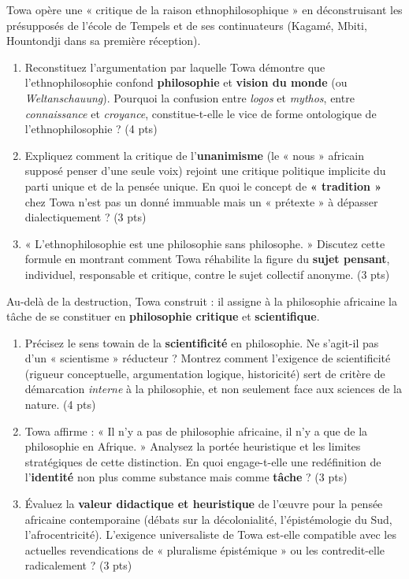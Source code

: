 \documentclass[11pt]{article}
\begin{document}
\begin{exercice}
Towa opère une « critique de la raison ethnophilosophique » en déconstruisant les présupposés de l'école de Tempels et de ses continuateurs (Kagamé, Mbiti, Hountondji dans sa première réception).
\begin{enumerate}
    \item Reconstituez l'argumentation par laquelle Towa démontre que l'ethnophilosophie confond \textbf{philosophie} et \textbf{vision du monde} (ou \textit{Weltanschauung}). Pourquoi la confusion entre \textit{logos} et \textit{mythos}, entre \textit{connaissance} et \textit{croyance}, constitue-t-elle le vice de forme ontologique de l'ethnophilosophie ? (4 pts)
    \item Expliquez comment la critique de l'\textbf{unanimisme} (le « nous » africain supposé penser d'une seule voix) rejoint une critique politique implicite du parti unique et de la pensée unique. En quoi le concept de \textbf{« tradition »} chez Towa n'est pas un donné immuable mais un « prétexte » à dépasser dialectiquement ? (3 pts)
    \item « L'ethnophilosophie est une philosophie sans philosophe. » Discutez cette formule en montrant comment Towa réhabilite la figure du \textbf{sujet pensant}, individuel, responsable et critique, contre le sujet collectif anonyme. (3 pts)
\end{enumerate}
\end{exercice}

\begin{exercice}
Au-delà de la destruction, Towa construit : il assigne à la philosophie africaine la tâche de se constituer en \textbf{philosophie critique} et \textbf{scientifique}.
\begin{enumerate}
    \item Précisez le sens towain de la \textbf{scientificité} en philosophie. Ne s'agit-il pas d'un « scientisme » réducteur ? Montrez comment l'exigence de scientificité (rigueur conceptuelle, argumentation logique, historicité) sert de critère de démarcation \textit{interne} à la philosophie, et non seulement face aux sciences de la nature. (4 pts)
    \item Towa affirme : « Il n'y a pas de philosophie africaine, il n'y a que de la philosophie en Afrique. » Analysez la portée heuristique et les limites stratégiques de cette distinction. En quoi engage-t-elle une redéfinition de l'\textbf{identité} non plus comme substance mais comme \textbf{tâche} ? (3 pts)
    \item Évaluez la \textbf{valeur didactique et heuristique} de l'œuvre pour la pensée africaine contemporaine (débats sur la décolonialité, l'épistémologie du Sud, l'afrocentricité). L'exigence universaliste de Towa est-elle compatible avec les actuelles revendications de « pluralisme épistémique » ou les contredit-elle radicalement ? (3 pts)
\end{enumerate}
\end{exercice}
\end{document}
